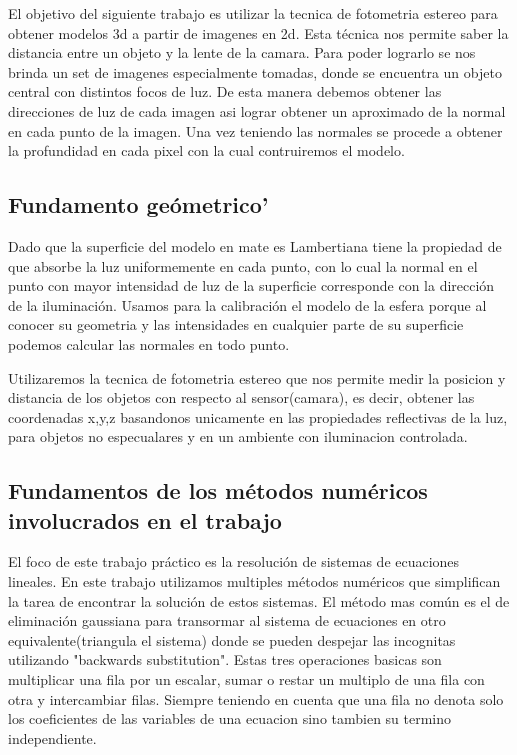 El objetivo del siguiente trabajo es utilizar la tecnica de fotometria estereo para obtener modelos 3d a partir de imagenes en 2d. Esta t\'ecnica nos permite saber la distancia entre un objeto y la lente de la camara. Para poder lograrlo se nos brinda un set de imagenes especialmente tomadas, donde se encuentra un objeto central con distintos focos de luz.
De esta manera debemos obtener las direcciones de luz de cada imagen asi lograr obtener un aproximado de la normal en cada punto de la imagen. Una vez teniendo las normales se procede a obtener la profundidad en cada pixel con la cual contruiremos el modelo.


\subsection{Fundamento ge\'ometrico'}
Dado que la superficie del modelo en mate es Lambertiana tiene la propiedad de que absorbe la luz uniformemente en cada punto, con lo cual la normal en el punto con mayor intensidad de luz de la superficie corresponde con la direcci\'on de la iluminaci\'on. Usamos para la calibraci\'on el modelo de la esfera porque al conocer su geometria y las intensidades en cualquier parte de su superficie podemos calcular las normales en todo punto.

Utilizaremos la tecnica de fotometria estereo que nos permite medir la posicion y distancia de los objetos con respecto al sensor(camara), es decir, obtener las coordenadas x,y,z basandonos unicamente en las propiedades reflectivas de la luz, para objetos no especualares y en un ambiente con iluminacion controlada.


\subsection{Fundamentos de los m\'etodos num\'ericos involucrados en el trabajo}


El foco de este trabajo pr\'actico es la resoluci\'on de sistemas de ecuaciones lineales.
En este trabajo utilizamos multiples m\'etodos num\'ericos que simplifican la tarea de encontrar la soluci\'on de estos sistemas. 
El m\'etodo mas com\'un es el de eliminaci\'on gaussiana para transormar al sistema de ecuaciones en otro equivalente(triangula el sistema) donde se pueden despejar las incognitas utilizando "backwards substitution". 
Estas tres operaciones basicas son multiplicar una fila por un escalar, sumar o restar un multiplo de una fila con otra y intercambiar filas. Siempre teniendo en cuenta que una fila no denota solo los coeficientes de las variables de una ecuacion sino tambien su termino independiente.




